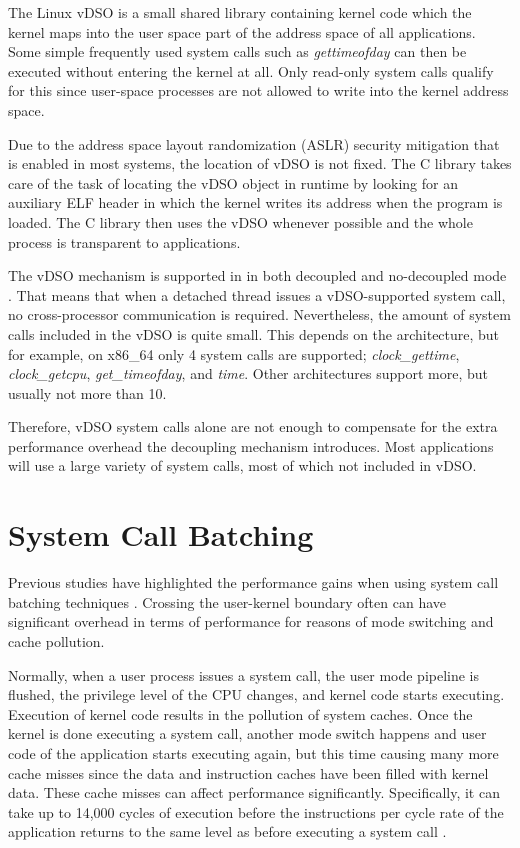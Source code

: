 The Linux vDSO is a small shared library containing kernel code which the
kernel maps into the user space part of the address space of all applications.
Some simple frequently used system calls such as \emph{gettimeofday} can then
be executed without entering the kernel at all. Only read-only system calls
qualify for this since user-space processes are not allowed to write into the
kernel address space.

Due to the address space layout randomization (ASLR) security mitigation that
is enabled in most systems, the location of vDSO is not fixed. The C library
takes care of the task of locating the vDSO object in runtime by looking for an
auxiliary ELF header in which the kernel writes its address when the program is
loaded. The C library then uses the vDSO whenever possible and the whole
process is transparent to applications.

The vDSO mechanism is supported in \llinux in both decoupled and no-decoupled
mode \cite{decoupling}. That means that when a detached thread issues a
vDSO-supported system call, no cross-processor communication is required.
Nevertheless, the amount of system calls included in the vDSO is quite small.
This depends on the architecture, but for example, on x86\_64 only 4 system
calls are supported; \emph{clock\_gettime}, \emph{clock\_getcpu},
\emph{get\_timeofday}, and \emph{time}. Other architectures support more, but
usually not more than 10.

Therefore, vDSO system calls alone are not enough to compensate for the extra
performance overhead the decoupling mechanism introduces. Most applications
will use a large variety of system calls, most of which not included in vDSO.

\section{System Call Batching}

Previous studies have highlighted the performance gains when using system call
batching techniques
\cite{clustering}\cite{compositecalls}\cite{cassyopia}\cite{compositecalls2}.
Crossing the user-kernel boundary often can have significant overhead in terms
of performance for reasons of mode switching and cache pollution.

Normally, when a user process issues a system call, the user mode pipeline is
flushed, the privilege level of the CPU changes, and kernel code starts
executing. Execution of kernel code results in the pollution of system caches.
Once the kernel is done executing a system call, another mode switch happens
and user code of the application starts executing again, but this time causing
many more cache misses since the data and instruction caches have been filled
with kernel data. These cache misses can affect performance significantly.
Specifically, it can take up to 14,000 cycles of execution before the
instructions per cycle rate of the application returns to the same level as
before executing a system call \cite{flexsc}.

